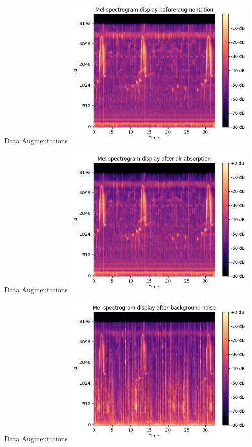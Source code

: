 \begin{frame}{Data Augmentations}
    \centering
    \includegraphics[height=0.7\textheight,width=0.7\textwidth,keepaspectratio]{images/before_aug.png}
\end{frame}

\begin{frame}{Data Augmentations}
    \centering
    \includegraphics[height=0.7\textheight,width=0.7\textwidth,keepaspectratio]{images/airabsorption.png}
\end{frame}

\begin{frame}{Data Augmentations}
    \centering
    \includegraphics[height=0.7\textheight,width=0.7\textwidth,keepaspectratio]{images/backgroundNoise.png}
\end{frame}